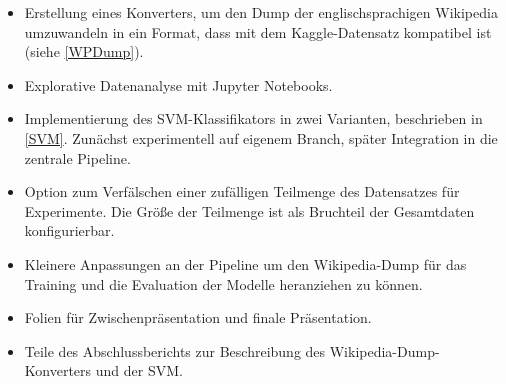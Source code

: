 \begin{itemize}
    \item Erstellung eines Konverters, um den Dump der englischsprachigen Wikipedia umzuwandeln in ein Format, dass mit dem Kaggle-Datensatz kompatibel ist (siehe \ref{WPDump}).
    \item Explorative Datenanalyse mit Jupyter Notebooks.
    \item Implementierung des SVM-Klassifikators in zwei Varianten, beschrieben in \ref{SVM}. Zunächst experimentell auf eigenem Branch, später Integration in die zentrale Pipeline.
    \item Option zum Verfälschen einer zufälligen Teilmenge des Datensatzes für Experimente. Die Größe der Teilmenge ist als Bruchteil der Gesamtdaten konfigurierbar.
    \item Kleinere Anpassungen an der Pipeline um den Wikipedia-Dump für das Training und die Evaluation der Modelle heranziehen zu können.
    \item Folien für Zwischenpräsentation und finale Präsentation.
    \item Teile des Abschlussberichts zur Beschreibung des Wikipedia-Dump-Konverters und der SVM.
\end{itemize}

